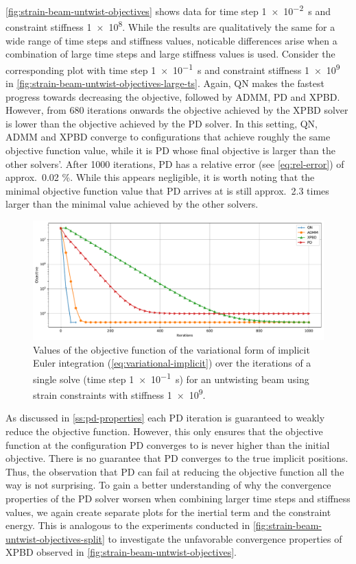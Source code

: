 \autoref{fig:strain-beam-untwist-objectives} shows data for time step \SI{1e-2}{\second} and constraint stiffness \num{1e8}. While the results are qualitatively 
the same for a wide range of time steps and stiffness values, noticable differences arise when a combination of large time steps and large stiffness values is used.
Consider the corresponding plot with time step \SI{1e-1}{\second} and constraint stiffness \num{1e9} in \autoref{fig:strain-beam-untwist-objectives-large-ts}. Again,
QN makes the fastest progress towards decreasing the objective, followed by ADMM, PD and XPBD. However, from 680 iterations onwards the objective achieved by the XPBD 
solver is lower than the objective achieved by the PD solver. In this setting, QN, ADMM and XPBD converge to configurations that achieve roughly the same objective 
function value, while it is PD whose final objective is larger than the other solvers'. After 1000 iterations, PD has a relative error (see \cref{eq:rel-error}) 
of approx.\ 0.02 \%. While this appears negligible, it is worth noting that the minimal objective function value that PD arrives at is still approx.\ 2.3 
times larger than the minimal value achieved by the other solvers.


\begin{figure}[h]
    \includegraphics[width=\textwidth]{figures/strain_beam_untwist_objectives_large_ts.pdf}
    \caption{Values of the objective function of the variational form of implicit Euler integration (\cref{eq:variational-implicit}) over the iterations of a single solve (time step 
    \SI{1e-1}{\second}) for an untwisting beam using strain constraints with stiffness \num{1e9}.}
    \label{fig:strain-beam-untwist-objectives-large-ts}
\end{figure}

As discussed in \autoref{ss:pd-properties} each PD iteration is guaranteed to weakly reduce the objective function. However, this only ensures that the objective function 
at the configuration PD converges to is never higher than the initial objective. There is no guarantee that 
PD converges to the true implicit positions. Thus, the observation that PD can fail at reducing the objective function all the way is not surprising. To gain a better 
understanding of why the convergence properties of the PD solver worsen when combining larger time steps and stiffness values, we again create separate plots for the 
inertial term and the constraint energy. This is analogous to the experiments conducted in \autoref{fig:strain-beam-untwist-objectives-split} to investigate 
the unfavorable convergence properties of XPBD observed in \autoref{fig:strain-beam-untwist-objectives}. 

